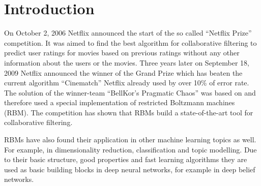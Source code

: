 \documentclass[crop=false,10pt]{standalone}
\begin{document}
  \section{Introduction} %
  \label{sec:introduction}
    On October 2, 2006 Netflix announced the start of the so called \enquote{Netflix Prize} competition.
    It was aimed to find the best algorithm for collaborative filtering to predict user ratings for movies based on previous ratings without any other information about the users or the movies.
    Three years later on September 18, 2009 Netflix announced the winner of the Grand Prize which has beaten the current algorithm \enquote{Cinematch} Netflix already used by over 10\% of error rate.
    The solution of the winner-team \enquote{BellKor's Pragmatic Chaos} was based on \cite{Hinton2007} and therefore used a special implementation of restricted Boltzmann machines (RBM).
    The competition has shown that RBMs build a state-of-the-art tool for collaborative filtering.

    RBMs have also found their application in other machine learning topics as well.
    For example, in dimensionality reduction, classification and topic modelling.
    Due to their basic structure, good properties and fast learning algorithms they are used as basic building blocks in deep neural networks, for example in deep belief networks.
\end{document}
